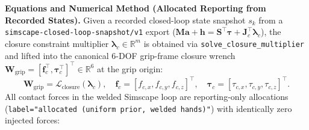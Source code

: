 \documentclass[11pt,a4paper]{article}
\begin{document}
\textbf{Equations and Numerical Method (Allocated Reporting from Recorded States).}
Given a recorded closed-loop state snapshot $s_k$ from a \texttt{simscape-closed-loop-snapshot/v1} export ($\mathbf{M}\mathbf{a} + \mathbf{h} = \mathbf{S}^{\top}\boldsymbol{\tau} + \mathbf{J}_c^{\top}\boldsymbol{\lambda}_c$), the closure constraint multiplier $\boldsymbol{\lambda}_c \in \mathbb{R}^m$ is obtained via \texttt{solve\_closure\_multiplier} and lifted into the canonical 6-DOF grip-frame closure wrench $\mathbf{W}_{\mathrm{grip}} = [\mathbf{f}_c^{\top}, \boldsymbol{\tau}_c^{\top}]^{\top} \in \mathbb{R}^6$ at the grip origin:
\begin{equation}
\mathbf{W}_{\mathrm{grip}} = \mathcal{L}_{\text{closure}}\!\left(\boldsymbol{\lambda}_c\right), \quad
\mathbf{f}_c = [f_{c,x}, f_{c,y}, f_{c,z}]^{\top}, \quad
\boldsymbol{\tau}_c = [\tau_{c,x}, \tau_{c,y}, \tau_{c,z}]^{\top}.
\end{equation}
All contact forces in the welded Simscape loop are reporting-only allocations (\texttt{label="allocated (uniform prior, welded hands)"}) with identically zero injected forces:
\end{document}
